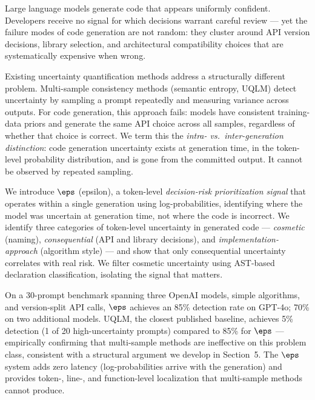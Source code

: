 Large language models generate code that appears uniformly confident.
Developers receive no signal for which decisions warrant careful review —
yet the failure modes of code generation are not random: they cluster around
API version decisions, library selection, and architectural compatibility choices
that are systematically expensive when wrong.

Existing uncertainty quantification methods address a structurally different
problem. Multi-sample consistency methods (semantic entropy, UQLM) detect
uncertainty by sampling a prompt repeatedly and measuring variance across
outputs. For code generation, this approach fails: models have consistent
training-data priors and generate the same API choice across all samples,
regardless of whether that choice is correct. We term this the
\emph{intra- vs.\ inter-generation distinction}: code generation uncertainty
exists at generation time, in the token-level probability distribution,
and is gone from the committed output. It cannot be observed by repeated
sampling.

We introduce $\eps$ (epsilon), a token-level \emph{decision-risk prioritization
signal} that operates within a single generation using log-probabilities,
identifying where the model was uncertain at generation time, not where the
code is incorrect. We identify three
categories of token-level uncertainty in generated code --- \emph{cosmetic}
(naming), \emph{consequential} (API and library decisions), and
\emph{implementation-approach} (algorithm style) --- and show that only
consequential uncertainty correlates with real risk. We filter cosmetic
uncertainty using AST-based declaration classification, isolating the signal
that matters.

On a 30-prompt benchmark spanning three OpenAI models, simple algorithms, and
version-split API calls, $\eps$ achieves an 85\% detection rate on GPT-4o;
70\% on two additional models. UQLM, the closest published baseline,
achieves 5\% detection (1 of 20 high-uncertainty prompts) compared to 85\%
for $\eps$ --- empirically confirming that multi-sample methods are
ineffective on this problem class, consistent with a structural argument we
develop in Section~5.
The $\eps$ system adds zero latency (log-probabilities arrive with the
generation) and provides token-, line-, and function-level localization
that multi-sample methods cannot produce.
